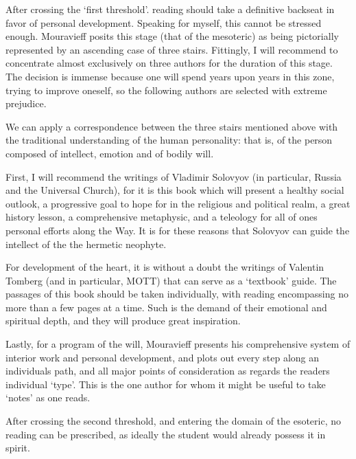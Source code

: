 \begin{footnotesize}
\begin{sffamily}
After crossing the `first threshold'. reading should take a definitive backseat in favor of personal development. Speaking for myself, this cannot be stressed enough. Mouravieff posits this stage (that of the mesoteric) as being pictorially represented by an ascending case of three stairs. Fittingly, I will recommend to concentrate almost exclusively on three authors for the duration of this stage. The decision is immense because one will spend years upon years in this zone, trying to improve oneself, so the following authors are selected with extreme prejudice.

We can apply a correspondence between the three stairs mentioned above with the traditional understanding of the human personality: that is, of the person composed of intellect, emotion and of bodily will. 

First, I will recommend the writings of Vladimir Solovyov (in particular, Russia and the Universal Church), for it is this book which will present a healthy social outlook, a progressive goal to hope for in the religious and political realm, a great history lesson, a comprehensive metaphysic, and a teleology for all of ones personal efforts along the Way. It is for these reasons that Solovyov can guide the intellect of the the hermetic neophyte.

For development of the heart, it is without a doubt the writings of Valentin Tomberg (and in particular, MOTT) that can serve as a `textbook' guide. The passages of this book should be taken individually, with reading encompassing no more than a few pages at a time. Such is the demand of their emotional and spiritual depth, and they will produce great inspiration.

Lastly, for a program of the will, Mouravieff presents his comprehensive system of interior work and personal development, and plots out every step along an individuals path, and all major points of consideration as regards the readers individual `type'. This is the one author for whom it might be useful to take `notes' as one reads.

After crossing the second threshold, and entering the domain of the esoteric, no reading can be prescribed, as ideally the student would already possess it in spirit.


\end{sffamily}\end{footnotesize}

